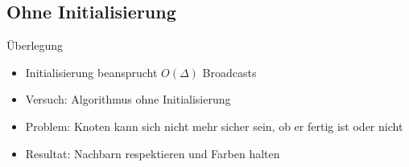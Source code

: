 \documentclass[18pt]{beamer}
\begin{document}
\subsection{Ohne Initialisierung}
\begin{frame}{Überlegung}
	\begin{itemize}[<+->]
		\item Initialisierung beansprucht $O(\Delta)$ Broadcasts
		\item Versuch: Algorithmus ohne Initialisierung
		\item Problem: Knoten kann sich nicht mehr sicher sein, ob er fertig ist oder nicht
		\item Resultat: Nachbarn respektieren und Farben halten
	\end{itemize}
\end{frame}
\end{document}
